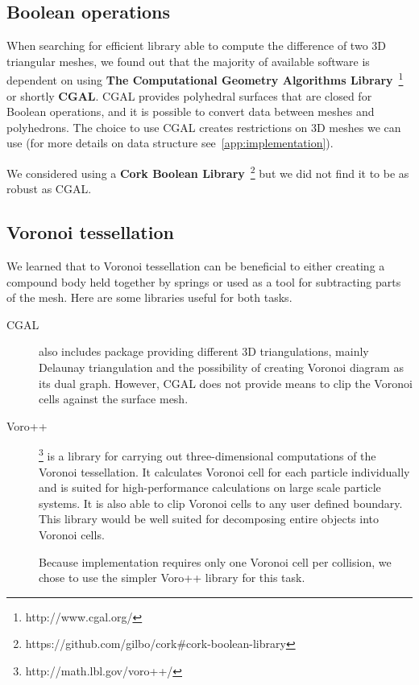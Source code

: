 \subsection{Boolean operations}
When searching for efficient library able to compute the difference of two 3D triangular meshes, we found out that the majority of available software is dependent on using \textbf{The Computational Geometry Algorithms Library}~\footnote{http://www.cgal.org/} or shortly \textbf{CGAL}. CGAL provides polyhedral surfaces that are closed for Boolean operations, and it is possible to convert data between meshes and polyhedrons. The choice to use CGAL creates restrictions on 3D meshes we can use (for more details on data structure see~\cref{app:implementation}).

We considered using a \textbf{Cork Boolean Library}~\footnote{https://github.com/gilbo/cork\#cork-boolean-library} but we did not find it to be as robust as CGAL.

\subsection{Voronoi tessellation}
We learned that to Voronoi tessellation can be beneficial to either creating a compound body held together by springs or used as a tool for subtracting parts of the mesh. Here are some libraries useful for both tasks.

\begin{description}
\item[CGAL] also includes package providing different 3D triangulations, mainly Delaunay triangulation and the possibility of creating Voronoi diagram as its dual graph. However, CGAL does not provide means to clip the Voronoi cells against the surface mesh.

\item[Voro++]\footnote{http://math.lbl.gov/voro++/} is a library for carrying out three-dimensional computations of the Voronoi tessellation. It calculates Voronoi cell for each particle individually and is suited for high-performance calculations on large scale particle systems. It is also able to clip Voronoi cells to any user defined boundary. This library would be well suited for decomposing entire objects into Voronoi cells. 

Because implementation requires only one Voronoi cell per collision, we chose to use the simpler Voro++ library for this task. 
\end{description}


